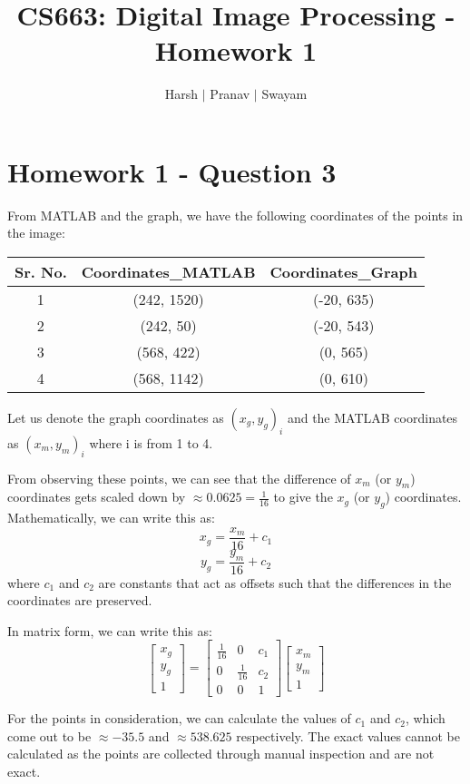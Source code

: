\documentclass{article}
\title{CS663: Digital Image Processing - Homework 1}
\author{Harsh $\vert$ Pranav $\vert$ Swayam}
\begin{document}
\maketitle
\section{Homework 1 - Question 3}

From MATLAB and the graph, we have the following coordinates of the points in the image:
\begin{table}[H]
\centering
\begin{tabular}{|c|c|c|}
\hline
Sr. No. & Coordinates\_MATLAB & Coordinates\_Graph \\
\hline
1 & (242, 1520) & (-20, 635) \\
\hline
2 & (242, 50) & (-20, 543) \\
\hline
3 & (568, 422) & (0, 565) \\
\hline
4 & (568, 1142) & (0, 610) \\
\hline
\end{tabular}
\end{table}

Let us denote the graph coordinates as $(x_g, y_g)_i$ and the MATLAB coordinates as $(x_m, y_m)_i$ where i is from 1 to 4.

From observing these points, we can see that the difference of $x_m$ (or $y_m$) coordinates gets scaled down by $\approx 0.0625 = \frac{1}{16}$ to give the $x_g$ (or $y_g$) coordinates.
Mathematically, we can write this as:
\begin{equation}
x_g = \frac{x_m}{16} + c_1
\end{equation}
\begin{equation}
y_g = \frac{y_m}{16} + c_2
\end{equation}
where $c_1$ and $c_2$ are constants that act as offsets such that the differences in the coordinates are preserved.

In matrix form, we can write this as:
\begin{equation}
\begin{bmatrix}
x_g \\
y_g \\
1
\end{bmatrix}
=
\begin{bmatrix}
\frac{1}{16} & 0 & c_1 \\
0 & \frac{1}{16} & c_2 \\
0 & 0 & 1
\end{bmatrix}
\begin{bmatrix}
x_m \\
y_m \\
1
\end{bmatrix}
\end{equation}

For the points in consideration, we can calculate the values of $c_1$ and $c_2$, which come out to be $\approx-35.5$ and $\approx538.625$ respectively. The exact values cannot be calculated as the points are collected through manual inspection and are not exact.
\end{document}
